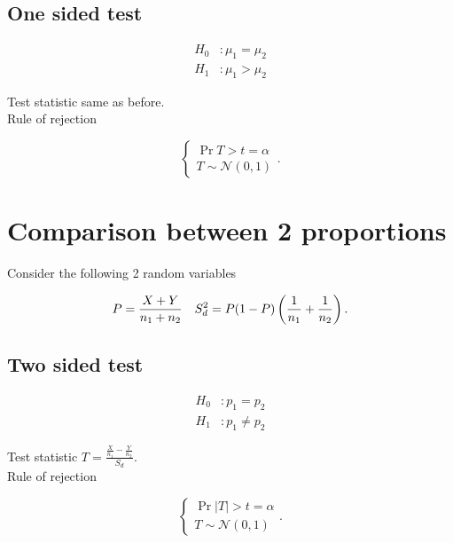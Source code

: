 \documentclass{report}
\begin{document}
\subsection{One sided test}

\begin{align*}
	H_0 & : \mu_1 = \mu_2 \\
	H_1 & : \mu_1 > \mu_2
\end{align*}

Test statistic same as before.\\

Rule of rejection

\[
	\begin{cases}
		\Pr{T>t} = \alpha \\
		T\sim \mathcal{N}(0,1)
	\end{cases}
	.\]


\section{Comparison between 2 proportions}

Consider the following 2 random variables

\[
	P = \frac{X+Y}{n_1+n_2}\quad S_d^2 = P(1-P)\left(\frac{1}{n_1} + \frac{1}{n_2}\right)
	.\]

\subsection{Two sided test}

\begin{align*}
	H_0 & : p_1 = p_2    \\
	H_1 & : p_1 \neq p_2
\end{align*}

Test statistic $T = \frac{\frac{X}{n_1} - \frac{Y}{n_2}}{S_d}$.\\

Rule of rejection

\[
	\begin{cases}
		\Pr{|T|>t} = \alpha \\
		T\sim \mathcal{N}(0,1)
	\end{cases}
	.\]
\end{document}
